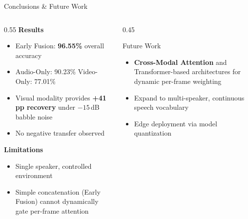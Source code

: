 \documentclass{beamer}
\begin{document}
\begin{frame}[shrink=5]{Conclusions \& Future Work}
  \begin{columns}
    \begin{column}{0.55\textwidth}
      \textbf{Results}
      \begin{itemize}
        \item Early Fusion: \textbf{96.55\%} overall accuracy
        \item Audio-Only: 90.23\% \quad Video-Only: 77.01\%
        \item Visual modality provides \textbf{+41\,pp recovery} under $-15$\,dB babble noise
        \item No negative transfer observed
      \end{itemize}
      \vspace{0.4em}
      \textbf{Limitations}
      \begin{itemize}
        \item Single speaker, controlled environment
        \item Simple concatenation (Early Fusion) cannot dynamically gate per-frame attention
      \end{itemize}
    \end{column}
    \begin{column}{0.45\textwidth}
      \begin{block}{Future Work}
        \begin{itemize}
          \item \textbf{Cross-Modal Attention} and Transformer-based architectures for dynamic per-frame weighting
          \item Expand to multi-speaker, continuous speech vocabulary
          \item Edge deployment via model quantization
        \end{itemize}
      \end{block}
    \end{column}
  \end{columns}
\end{frame}

\backmatter
\end{document}
